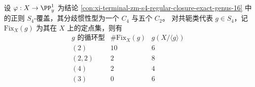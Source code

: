 \begin{conclusion}\label{con:xi-terminal-zm-s4-conjugacy-class-fixedpoints-and-cyclic-quotient-genera}
设
\(
\varphi:X\to \PP^1_y
\)
为结论 \ref{con:xi-terminal-zm-s4-regular-closure-exact-genus-16} 中的正则 \(S_4\)-覆盖，其分歧惯性型为一个 \(C_4\) 与五个 \(C_2\)。
对共轭类代表 \(g\in S_4\)，记 \(\mathrm{Fix}_X(g)\) 为其在 \(X\) 上的定点集，则有
\[
\begin{array}{c|c|c}
g\text{ 的循环型} & \#\mathrm{Fix}_X(g) & g(X/\langle g\rangle)\\
\hline
(2) & 10 & 6\\
(2,2) & 2 & 8\\
(4) & 2 & 4\\
(3) & 0 & 6
\end{array}
\]
\end{conclusion}
